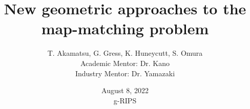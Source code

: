 \documentclass[aspectratio=169, bigfiles]{beamer}
\title[Mitsubishi A]{New geometric approaches to the map-matching problem}
\author[T. Akamatsu, G. Gress, K. Huneycutt, S. Omura]{T. Akamatsu, G. Gress, K. Huneycutt, S. Omura \\
Academic Mentor: Dr. Kano \\
Industry Mentor: Dr. Yamazaki}
\date[15/07] %
{\quad August 8, 2022 \\  \quad g-RIPS}
\begin{document}











\begin{frame}
\titlepage


\end{frame}



\end{document}
